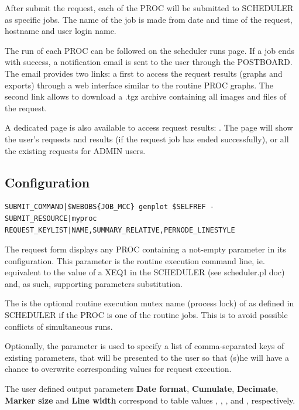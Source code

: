After submit the request, each of the PROC will be submitted to SCHEDULER as specific jobs. The name of the job is made from date and time of the request, hostname and user login name.

The run of each PROC can be followed on the scheduler runs page. If a job ends with success, a notification email is sent to the user through the POSTBOARD. The email provides two links: a first to access the request results (graphs and exports) through a web interface similar to the routine PROC graphs. The second link allows to download a .tgz archive containing all images and files of the request.

A dedicated page is also available to access request results: . The page will show the user's requests and results (if the request job has ended successfully), or all the existing requests for ADMIN users.


\subsection{Configuration}

\begin{lstlisting}[title=\wofile{PROC.conf} (excerpt)]
SUBMIT_COMMAND|$WEBOBS{JOB_MCC} genplot $SELFREF -
SUBMIT_RESOURCE|myproc
REQUEST_KEYLIST|NAME,SUMMARY_RELATIVE,PERNODE_LINESTYLE
\end{lstlisting}

The request form displays any PROC containing a not-empty  parameter in its configuration. This parameter is the routine execution command line, ie. equivalent to the value of a XEQ1 in the SCHEDULER (see scheduler.pl doc) and, as such,
supporting  parameters substitution.

The  is the optional routine execution mutex name (process lock) of as defined in SCHEDULER if the PROC is one of the routine jobs. This is to avoid possible conflicts of simultaneous runs.

Optionally, the  parameter is used to specify a list of comma-separated keys of existing parameters, that will be
presented to the user so that (s)he will have a chance to overwrite corresponding values for request execution.

The user defined output parameters \textbf{Date format}, \textbf{Cumulate}, \textbf{Decimate}, \textbf{Marker size} and \textbf{Line width} correspond to table values , , ,  and , respectively.


